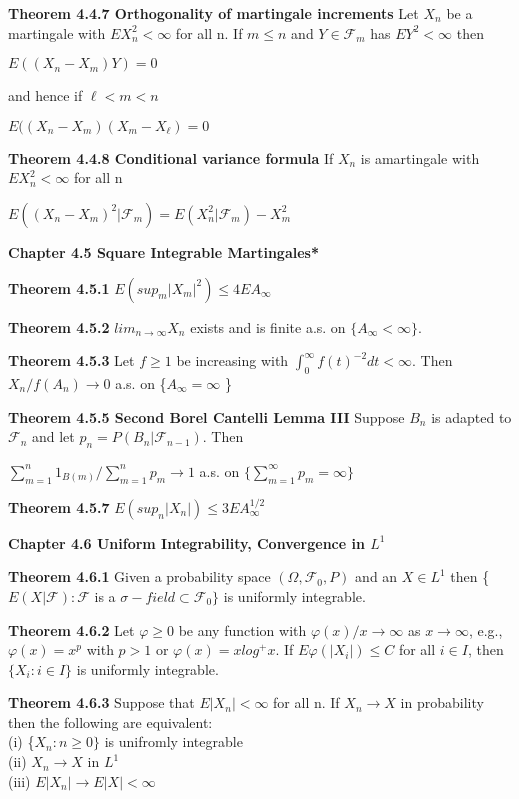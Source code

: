 \documentclass{article}
\newcommand\tab[1][1cm]{\hspace*{#1}}
\begin{document}
\textbf {Theorem 4.4.7 Orthogonality of martingale increments} Let $X_n$ be a martingale with $EX_n^2 < \infty$ for all n. If $m \leq n$ and $Y \in \mathcal{F}_m$ has $EY^2 < \infty$ then
\begin{center}
$E((X_n - X_m)Y) = 0$
\end{center}
and hence if $\ell < m < n$
\begin{center}
$E((X_n - X_m)(X_m - X_{\ell}) = 0$
\end{center}

\textbf {Theorem 4.4.8 Conditional variance formula} If $X_n$ is amartingale with $EX_n^2 < \infty$ for all n
\begin{center}
$E((X_n - X_m)^2|\mathcal{F}_m) = E(X_n^2 | \mathcal{F}_m) - X_m^2$
\end{center}

\textbf {Chapter 4.5 Square Integrable Martingales*}

\textbf {Theorem 4.5.1} $E(sup_{m} |X_m|^2) \leq 4EA_\infty$

\textbf {Theorem 4.5.2} $lim_{n \to \infty} X_n$ exists and is finite a.s. on $\{ A_{\infty} < \infty \}$.

\textbf {Theorem 4.5.3} Let $f \geq 1$ be increasing with $\int_0^\infty f(t)^{-2} dt < \infty$. Then $X_n / f(A_n) \to 0$ a.s. on \{$A_{\infty} = \infty$ \}

\textbf {Theorem 4.5.5 Second Borel Cantelli Lemma III} Suppose $B_n$ is adapted to $\mathcal{F}_n$ and let $p_n = P(B_n | \mathcal{F}_{n-1})$. Then
\begin{center}
$\sum_{m=1}^n 1_{B(m)} / \sum_{m=1}^n p_m \to 1$ \tab a.s. on $\{ \sum_{m=1}^\infty p_m = \infty \}$
\end{center}

\textbf {Theorem 4.5.7} $E(sup_{n} |X_n|) \leq 3EA_{\infty}^{1/2}$

\textbf {Chapter 4.6 Uniform Integrability, Convergence in $L^1$}

\textbf {Theorem 4.6.1} Given a probability space $(\Omega, \mathcal{F}_0, P)$ and an $X \in L^1$ then \{$E(X|\mathcal{F}): \mathcal{F}$ is a $\sigma-field \subset \mathcal{F}_0 \}$ is uniformly integrable.

\textbf {Theorem 4.6.2} Let $\varphi \geq 0$ be any function with $\varphi(x) / x \to \infty$ as $x \to \infty$, e.g., $\varphi(x) = x^p$ with $p > 1$ or $\varphi(x) = x log^+ x$. If $E\varphi(|X_i|) \leq C$ for all $i \in I$, then $\{X_i : i \in I \}$ is uniformly integrable.

\textbf {Theorem 4.6.3} Suppose that $E|X_n| < \infty$ for all n. If $X_n \to X$ in probability then the following are equivalent: \\
(i) \{$X_n : n \geq 0 \}$ is unifromly integrable \\
(ii) $X_n \to X$ in $L^1$ \\
(iii) $E|X_n| \to E|X| < \infty$
\end{document}
